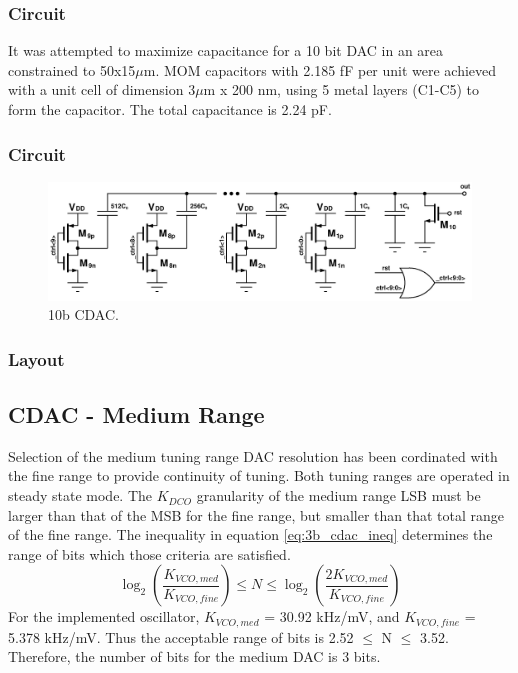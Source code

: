 		\subsubsection{Circuit}
		It was attempted to maximize capacitance for a 10 bit DAC in an area constrained to 50x15$\mu$m. MOM capacitors with 2.185 fF per unit were achieved with a unit cell of dimension 3$\mu$m x 200 nm, using 5 metal layers (C1-C5) to form the capacitor. The total capacitance is 2.24 pF.
	
		\subsubsection{Circuit}
			\begin{figure}[htb!]
			        \centering
			        \includegraphics[width=\textwidth, angle=0]{./figs/design/cdac_10b}
			    \caption{10b CDAC.}
			    \label{fig:10b_cdac_cir}
			\end{figure}

		\subsubsection{Layout}
	\FloatBarrier
	\subsection{CDAC - Medium Range}
	Selection of the medium tuning range DAC resolution has been cordinated with the fine range to provide continuity of tuning. Both tuning ranges are operated in steady state mode. The $K_{DCO}$ granularity of the medium range LSB must be larger than that of the MSB for the fine range, but smaller than that total range of the fine range. The inequality in equation \ref{eq:3b_cdac_ineq} determines the range of bits which those criteria are satisfied.
	\begin{equation}\label{eq:3b_cdac_ineq}
		\log_2\left( \frac{K_{VCO,med}}{K_{VCO,fine}}\right) \leq N \leq \log_2\left( \frac{2K_{VCO,med}}{K_{VCO,fine}}\right)
	\end{equation}
	For the implemented oscillator, $K_{VCO,med}$ = 30.92 kHz/mV, and $K_{VCO,fine}$ = 5.378 kHz/mV. Thus the acceptable range of bits is 2.52 $\leq$ N $\leq$ 3.52. Therefore, the number of bits for the medium DAC is 3 bits.
